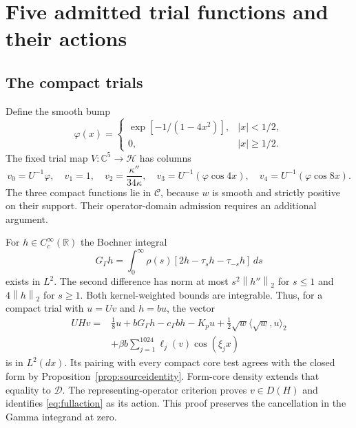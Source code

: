 \documentclass[11pt,a4paper]{article}
\numberwithin{equation}{section}
\theoremstyle{definition}\newtheorem{definition}[theorem]{Definition}
\theoremstyle{remark}\newtheorem{remark}[theorem]{Remark}
\newcommand{\HH}{\mathcal H}
\newcommand{\DD}{\mathcal D}
\newcommand{\R}{\mathbb R}
\newcommand{\C}{\mathbb C}
\newcommand{\ip}[2]{\langle #1,#2\rangle}
\newcommand{\norm}[1]{\left\|#1\right\|}
\begin{document}
\section{Five admitted trial functions and their actions}\label{sec:trials}
\subsection{The compact trials}
Define the smooth bump
\begin{equation}\label{eq:phi}
 \varphi(x)=\begin{cases}\exp[-1/(1-4x^2)],&|x|<1/2,\\0,&|x|\ge1/2.\end{cases}
\end{equation}
The fixed trial map $V:\C^5\to\HH$ has columns
\begin{equation}\label{eq:V}
 v_0=U^{-1}\varphi,\quad v_1=1,\quad
 v_2=\frac{\kappa''}{34\kappa},\quad
 v_3=U^{-1}(\varphi\cos4x),\quad v_4=U^{-1}(\varphi\cos8x).
\end{equation}
The three compact functions lie in $\mathcal C$, because $w$ is smooth and strictly positive on their support. Their operator-domain admission requires an additional argument.

For $h\in C_c^\infty(\R)$ the Bochner integral
\begin{equation}\label{eq:gammaaction}
 G_\Gamma h=\int_0^\infty\rho(s)[2h-\tau_s h-\tau_{-s}h]\,ds
\end{equation}
exists in $L^2$. The second difference has norm at most $s^2\norm{h''}_2$ for $s\le1$ and $4\norm h_2$ for $s\ge1$. Both kernel-weighted bounds are integrable. Thus, for a compact trial with $u=Uv$ and $h=bu$, the vector
\begin{align}\label{eq:fullaction}
 UHv={}&\tfrac18u+bG_\Gamma h-c_\Gamma bh-K_pu
 +\tfrac12\sqrt w\ip{\sqrt w}u_2\nonumber\\
 &+\beta b\sum_{j=1}^{1024}\ell_j(v)\cos(\xi_jx)
\end{align}
is in $L^2(dx)$. Its pairing with every compact core test agrees with the closed form by Proposition~\ref{prop:sourceidentity}. Form-core density extends that equality to $\DD$. The representing-operator criterion proves $v\in D(H)$ and identifies \eqref{eq:fullaction} as its action. This proof preserves the cancellation in the Gamma integrand at zero.
\end{document}
